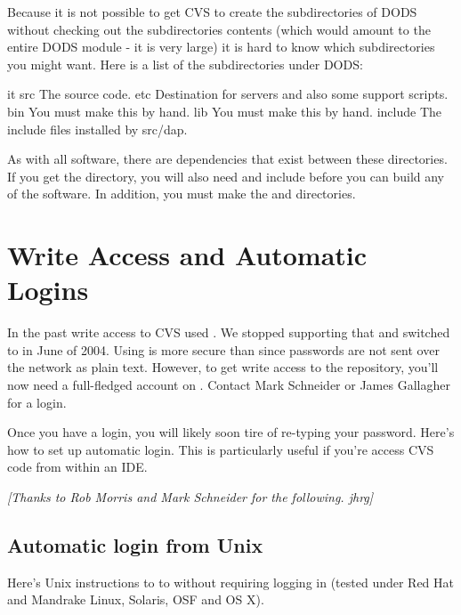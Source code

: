 \documentclass{dods-paper}
\begin{document}
Because it is not possible to get CVS to create the subdirectories of DODS without
checking out the subdirectories contents (which would amount to the entire DODS
module - it is very large) it is hard to know which subdirectories you might want.
Here is a list of the subdirectories under DODS:

\begin{vcode}{it}
src     The source code.
etc     Destination for servers and also some support scripts.
bin     You must make this by hand.
lib     You must make this by hand.
include The include files installed by src/dap.
\end{vcode}

As with all software, there are dependencies that exist between these
directories. If you get the  directory, you will also need 
and include before you can build any of the software. In addition, you must
make the  and  directories.

\section{Write Access and Automatic Logins}
\label{sec:automatic-login}

In the past write access to CVS used . We stopped supporting
that and switched to  in June of 2004. Using  is more
secure than  since passwords are not sent over the network as
plain text. However, to get write access to the repository, you'll now need a
full-fledged account on . Contact Mark Schneider
 or James Gallagher
 for a login.

Once you have a login, you will likely soon tire of re-typing your password.
Here's how to set up automatic  login. This is particularly useful if
you're access CVS code from within an IDE. 

\emph{[Thanks to Rob Morris and Mark Schneider for the following. jhrg]}

\subsection{Automatic login from Unix}

Here's Unix instructions to  to  without
requiring logging in (tested under Red Hat and Mandrake Linux, Solaris, OSF and
OS X).
\end{document}

